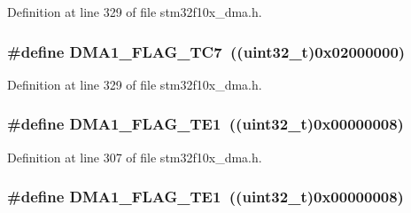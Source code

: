 Definition at line 329 of file stm32f10x\+\_\+dma.\+h.

\subsubsection[{\texorpdfstring{D\+M\+A1\+\_\+\+F\+L\+A\+G\+\_\+\+T\+C7}{DMA1_FLAG_TC7}}]{\setlength{\rightskip}{0pt plus 5cm}\#define D\+M\+A1\+\_\+\+F\+L\+A\+G\+\_\+\+T\+C7~(({\bf uint32\+\_\+t})0x02000000)}\hypertarget{group___d_m_a__flags__definition_ga327907756920f193d5d57d8cca845ad6}{}\label{group___d_m_a__flags__definition_ga327907756920f193d5d57d8cca845ad6}


Definition at line 329 of file stm32f10x\+\_\+dma.\+h.

\subsubsection[{\texorpdfstring{D\+M\+A1\+\_\+\+F\+L\+A\+G\+\_\+\+T\+E1}{DMA1_FLAG_TE1}}]{\setlength{\rightskip}{0pt plus 5cm}\#define D\+M\+A1\+\_\+\+F\+L\+A\+G\+\_\+\+T\+E1~(({\bf uint32\+\_\+t})0x00000008)}\hypertarget{group___d_m_a__flags__definition_gae30157801ac1460dab86a8f54cfd3479}{}\label{group___d_m_a__flags__definition_gae30157801ac1460dab86a8f54cfd3479}


Definition at line 307 of file stm32f10x\+\_\+dma.\+h.

\subsubsection[{\texorpdfstring{D\+M\+A1\+\_\+\+F\+L\+A\+G\+\_\+\+T\+E1}{DMA1_FLAG_TE1}}]{\setlength{\rightskip}{0pt plus 5cm}\#define D\+M\+A1\+\_\+\+F\+L\+A\+G\+\_\+\+T\+E1~(({\bf uint32\+\_\+t})0x00000008)}\hypertarget{group___d_m_a__flags__definition_gae30157801ac1460dab86a8f54cfd3479}{}\label{group___d_m_a__flags__definition_gae30157801ac1460dab86a8f54cfd3479}


